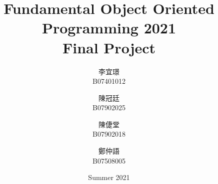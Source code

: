 \title{Fundamental Object Oriented Programming 2021 \\ Final Project} %
\author{
    李宜璟\\B07401012\\
    \and
    陳冠廷\\B07902025\\
    \and
    陳倢堂\\B07902018\\
    \and
    鄭仲語\\B07508005\\
}
\date{Summer 2021}
\begin{titlingpage}
\null  %
\nointerlineskip  %
\vfill
\let\snewpage \newpage
\let\newpage \relax
\maketitle
\thispagestyle{empty}
\let \newpage \snewpage
\vfill 
\break %
\end{titlingpage}

